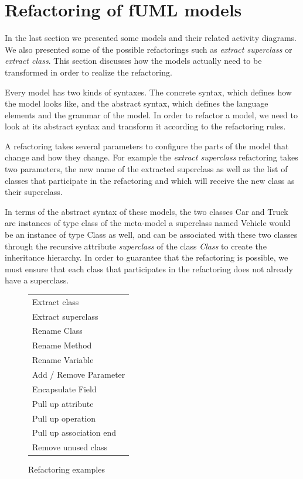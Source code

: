 \documentclass{llncs}
\begin{document}
\section{Refactoring of fUML models}
\label{sec:fuml-refactoring}

In the last section we presented some models and their related activity diagrams. We also presented some of the possible 
refactorings such as \textit{extract superclass} or \textit{extract class}. This section discusses how the models actually 
need to be transformed in order to realize the refactoring.

Every model has two kinds of syntaxes. The concrete syntax, which defines how the model looks like, and the abstract
syntax, which defines the language elements and the grammar of the model. In order to refactor a model, we need to look at
its abstract syntax and transform it according to the refactoring rules.

A refactoring takes several parameters to configure the parts of the model that change and how they change. For example
the \textit{extract superclass} refactoring takes two parameters, the new name of the extracted superclass as well as
the list of classes that participate in the refactoring and which will receive the new class as their superclass.

In terms of the abstract syntax of these models, the two classes Car and Truck are instances of type class of the meta-model a 
superclass named Vehicle would be an instance of type Class as well, and can be associated with these two classes through the 
recursive attribute \textit{superclass} of the class \textit{Class} to create the inheritance hierarchy. In order to guarantee 
that the refactoring is possible, we must ensure that each class that participates in the 
refactoring does not already have a superclass.

\begin{figure}[h!t]
 \centering
 \begin{tabular}[]{l}
  \hline
  Extract class\\
  Extract superclass\\
  Rename Class\\
  Rename Method\\
  Rename Variable\\
  Add / Remove Parameter\\
  Encapsulate Field\\
  Pull up attribute\\
  Pull up operation\\
  Pull up association end\\
  Remove unused class\\
  \hline
 \end{tabular}
 \caption{Refactoring examples}
 \label{fig:refactoringlist}
\end{figure}
\end{document}
